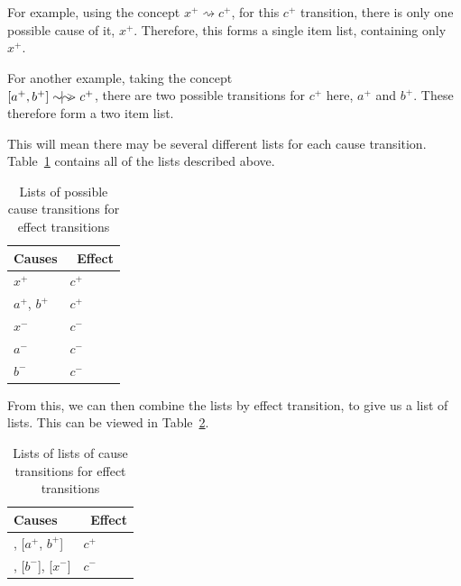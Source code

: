 \documentclass[british,conference,compsoc]{IEEEtran}
\begin{document}
For example, using the concept $x^{+} \rightsquigarrow c^{+}$, for this $c^{+}$ 
transition, there is only one possible cause of it, $x^{+}$. Therefore, this 
forms a single item list, containing only $x^{+}$.

For another example, taking the concept\\$[a^{+}, b^{+}]
\sim\hspace{-1.5mm}|\hspace{-1.5mm}\sim\hspace{-1.5mm}>c^{+}$, there are
two possible transitions for $c^{+}$ here, $a^{+}$ and $b^{+}$. These therefore 
form a two item list. 

This will mean there may be several different lists for each cause transition. 
Table~\ref{tab:list-of-concepts} contains all of the lists described above.

\begin{table}[h]
\caption{Lists of possible cause transitions for effect transitions
		\label{tab:list-of-concepts}}

  \centering
\begin{tabular}[htb]{| m{2.6cm} | m{2.0cm} |}
  \hline
Causes & \, Effect \\ \hline \hline
$x^{+}$ & $c^{+}$ \\ \hline
$a^{+}$, $b^{+}$ & $c^{+}$ \\ \hline
$x^{-}$ & $c^{-}$ \\ \hline
$a^{-}$ & $c^{-}$ \\ \hline
$b^{-}$ & $c^{-}$ \\ \hline
  \end{tabular}
\end{table}

\noindent From this, we can then combine the lists by effect transition, to 
give us a list of lists. This can be viewed in Table~\ref{tab:list-of-lists}.

\begin{table}[h]
\caption{Lists of lists of cause transitions for effect transitions
		\label{tab:list-of-lists}}

  \centering
\begin{tabular}[htb]{| m{2.6cm} | m{2.0cm} |}
  \hline
Causes & \, Effect \\ \hline \hline
[$x^{+}$], [$a^{+}$, $b^{+}$] & $c^{+}$ \\ \hline
[$a^{-}$], [$b^{-}$], [$x^{-}$] & $c^{-}$ \\ \hline

  \end{tabular}
\end{table}
\end{document}
